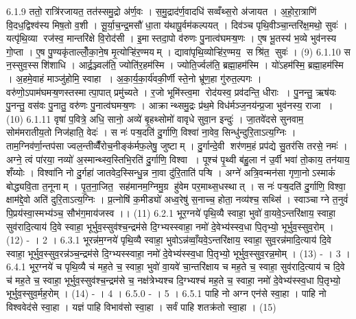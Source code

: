 6.1.9
ततो॒ रात्रि॑रजायत॒ तत॑स्समु॒द्रो अ॑र्ण॒वः । स॒मु॒द्राद॑र्ण॒वादधि॑ सव्वँथ्स॒रो अ॑जायत । अ॒हो॒रा॒त्राणि॑ वि॒दध॒द्विश्व॑स्य मिष॒तो व॒शी । सू॒र्या॒च॒न्द्र॒मसौ॑ धा॒ता य॑थापू॒र्वम॑कल्पयत् । दिव॑ञ्च पृथि॒वीञ्चा॒न्तरि॑क्ष॒मथो॒ सुवः॑ । यत्पृ॑थि॒व्या रज॑स्व॒ मान्तरि॑क्षे वि॒रोद॑सी । इ॒मास्तदा॒पो व॑रुणः पु॒नात्व॑घमऱ्ष॒णः । ए॒ष भू॒तस्य॑ भ॒व्ये भुव॑नस्य गो॒प्ता । ए॒ष पु॒ण्यकृ॑ताल्लोँ॒का॒ने॒ष मृ॒त्योऱ्हि॑र॒ण्मयम् । द्यावा॑पृथि॒व्योऱ्हि॑र॒ण्मय॒॒ सश्रि॑त॒॒ सुवः॑ । (9)
6.1.10
स न॒स्सुव॒स्सशि॑शाधि । आर्द्र॒ञ्ज्वल॑ति॒ ज्योति॑र॒हम॑स्मि । ज्योति॒र्ज्वल॑ति॒ ब्रह्मा॒हम॑स्मि । यो॑ऽहम॑स्मि॒ ब्रह्मा॒हम॑स्मि । अ॒हमे॒वाहं माञ्जु॑होमि॒ स्वाहा । अ॒का॒र्य॒का॒र्य॑वकी॒र्णी स्ते॒नो भ्रू॑ण॒हा गु॑रुत॒ल्पगः । वरु॑णो॒ऽपाम॑घमऱ्ष॒णस्तस्मात्पा॒पात् प्रमु॑च्यते । र॒जो भूमि॑स्त्व॒मा रोद॑यस्व॒ प्रव॑दन्ति॒ धीराः । पु॒नन्तु॒ ऋष॑यः पु॒नन्तु॒ वस॑वः पु॒नातु॒ वरु॑णः पु॒नात्व॑घमऱ्ष॒णः । आक्रान्थ्समु॒द्रः प्र॑थ॒मे विध॑र्मञ्ज॒नय॑न्प्र॒जा भुव॑नस्य॒ राजा । (10)
6.1.11
वृषा॑ प॒वित्रे॒ अधि॒ सानो॒ अव्ये॑ बृ॒हथ्सोमो॑ वावृधे सुवा॒न इन्दुः॑ । जा॒तवे॑दसे सुनवाम॒ सोम॑मरातीय॒तो निज॑हाति॒ वेदः॑ । स नः॑ पऱ्ष॒दति॑ दु॒र्गाणि॒ विश्वा॑ ना॒वेव॒ सिन्धु॑न्दुरि॒ताऽत्य॒ग्निः । ताम॒ग्निव॑र्णा॒न्तप॑सा ज्वल॒न्तीव्वैँ॑रोच॒नीङ्क॑र्मफ॒लेषु॒ जुष्टाम् । दु॒र्गान्दे॒वी शर॑णम॒हं प्रप॑द्ये सु॒तर॑सि तरसे॒ नमः॑ । अग्ने॒ त्वं पा॑रया॒ नव्यो॑ अ॒स्मान्थ्स्व॒स्तिभि॒रति॑ दु॒र्गाणि॒ विश्वा । पूश्च॑ पृ॒थ्वी ब॑हु॒ला न॑ उ॒र्वी भवा॑ तो॒काय॒ तन॑याय॒ शँय्योः । विश्वा॑नि नो दु॒र्गहा॑ जातवेद॒स्सिन्धु॒न्न ना॒वा दु॑रि॒ताति॑ पऱ्षि । अग्ने॑ अत्रि॒वन्मन॑सा गृणा॒नोऽस्माकं॑ बोद्ध्यवि॒ता त॒नूनाम् । पृ॒त॒ना॒जित॒॒ सह॑मानम॒ग्निमु॒ग्र हु॑वेम पर॒माथ्स॒धस्थात् । स नः॑ पऱ्ष॒दति॑ दु॒र्गाणि॒ विश्वा॒ क्षाम॑द्दे॒वो अति॑ दुरि॒ताऽत्य॒ग्निः । प्र॒त्नोषि॑ क॒मीड्यो॑ अध्व॒रेषु॑ स॒नाच्च॒ होता॒ नव्य॑श्च॒ सथ्सि॑ । स्वाञ्चाग्ने त॒नुवं॑ पि॒प्रय॑स्वा॒स्मभ्य॑ञ्च॒ सौभ॑ग॒माय॑जस्व ।। (11)
6.2.1
भूर॒ग्नये॑ पृथि॒व्यै स्वाहा॒ भुवो॑ वा॒यवे॒ऽन्तरि॑क्षाय॒ स्वाहा॒ सुव॑रादि॒त्याय॑ दि॒वे स्वाहा॒ भूर्भुव॒स्सुव॑श्च॒न्द्रम॑से दि॒ग्भ्यस्स्वाहा॒ नमो॑ दे॒वेभ्य॑स्स्व॒धा पि॒तृभ्यो॒ भूर्भुव॒स्सुव॒रोम् । (12) - । 2 ।
6.3.1
भूरन्न॑म॒ग्नये॑ पृथि॒व्यै स्वाहा॒ भुवोऽन्न॑व्वाँ॒यवे॒ऽन्तरि॑क्षाय॒ स्वाहा॒ सुव॒रन्न॑मादि॒त्याय॑ दि॒वे स्वाहा॒ भूर्भुव॒स्सुव॒रन्न॑ञ्च॒न्द्रम॑से दि॒ग्भ्यस्स्वाहा॒ नमो॑ दे॒वेभ्य॑स्स्व॒धा पि॒तृभ्यो॒ भूर्भुव॒स्सुव॒रन्न॒मोम् । (13) - । 3 ।
6.4.1
भूर॒ग्नये॑ च पृथि॒व्यै च॑ मह॒ते च॒ स्वाहा॒ भुवो॑ वा॒यवे॑ चा॒न्तरि॑क्षाय च मह॒ते च॒ स्वाहा॒ सुव॑रादि॒त्याय॑ च दि॒वे च॑ मह॒ते च॒ स्वाहा॒ भूर्भुव॒स्सुव॑श्च॒न्द्रम॑से च॒ नक्ष॑त्रेभ्यश्च दि॒ग्भ्यश्च॑ मह॒ते च॒ स्वाहा॒ नमो॑ दे॒वेभ्य॑स्स्व॒धा पि॒तृभ्यो॒ भूर्भुव॒स्सुव॒र्मह॒रोम् । (14) - । 4 ।
6.5.0
- । 5 ।
6.5.1
पाहि नो अग्न एन॑से स्वा॒हा । पाहि नो विश्ववेद॑से स्वा॒हा । यज्ञं पाहि विभाव॑सो स्वा॒हा । सर्वं पाहि शतक्र॑तो स्वा॒हा । (15)
